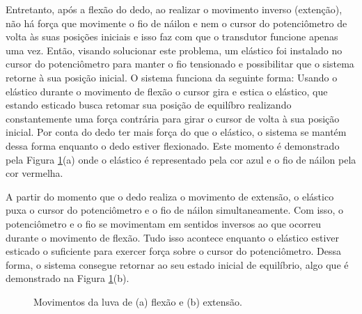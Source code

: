 \documentclass[
	12pt,				%
	openright,			%
	oneside,			%
	a4paper,			%
	english,			%
	brazil				%
	]{abntex2}
\begin{document}
		Entretanto, após a flexão do dedo, ao realizar o movimento inverso (extenção), não há força que movimente o fio de náilon e nem o cursor do potenciômetro de volta às suas posições iniciais e isso faz com que o transdutor funcione apenas uma vez. Então, visando solucionar este problema, um elástico foi instalado no cursor do potenciômetro para manter o fio tensionado e possibilitar que o sistema retorne à sua posição inicial. O sistema funciona da seguinte forma: Usando o elástico durante o movimento de flexão o cursor gira e estica o elástico, que estando esticado busca retomar sua posição de equilíbro realizando constantemente uma força contrária para girar o cursor de volta à sua posição inicial. Por conta do dedo ter mais força do que o elástico, o sistema se mantém dessa forma enquanto o dedo estiver flexionado. Este momento é demonstrado pela Figura \ref{Fig:glove-flex-and-extend2}(a) onde o elástico é representado pela cor azul e o fio de náilon pela cor vermelha.

		A partir do momento que o dedo realiza o movimento de extensão, o elástico puxa o cursor do potenciômetro e o fio de náilon simultaneamente. Com isso, o potenciômetro e o fio se movimentam em sentidos inversos ao que ocorreu durante o movimento de flexão. Tudo isso acontece enquanto o elástico estiver esticado o suficiente para exercer força sobre o cursor do potenciômetro. Dessa forma, o sistema consegue retornar ao seu estado inicial de equilíbrio, algo que é demonstrado na Figura \ref{Fig:glove-flex-and-extend2}(b).
		

	\begin{figure}[!htb]
		 \centering
		 \caption{ Movimentos da luva de (a) flexão e (b) extensão.} 
		 \centering
		 \label{Fig:glove-flex-and-extend2}
	\end{figure}
\end{document}
